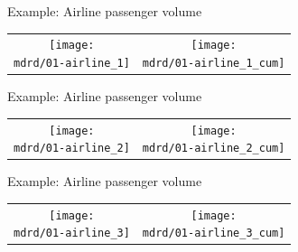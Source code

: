 \begin{frame}{Example: Airline passenger volume}
\newcommand{\wmgd}{0.5\columnwidth}
\newcommand{\hmgd}{3.0cm}
\newcommand{\mdrd}{../figures/01-airline}
\newcommand{\mbm}{\hspace{-0.3cm}}
{\footnotesize

}

\vspace{\baselineskip}

\begin{tabular}{cc}
\mbm \texttt{[image: \\mdrd/01-airline\_1]} & \texttt{[image: \\mdrd/01-airline\_1\_cum]}
\end{tabular}
\end{frame}

\begin{frame}{Example: Airline passenger volume}
\newcommand{\wmgd}{0.5\columnwidth}
\newcommand{\hmgd}{3.0cm}
\newcommand{\mdrd}{../figures/01-airline}
\newcommand{\mbm}{\hspace{-0.3cm}}
{\footnotesize

}

\vspace{\baselineskip}

\begin{tabular}{cc}
\mbm \texttt{[image: \\mdrd/01-airline\_2]} & \texttt{[image: \\mdrd/01-airline\_2\_cum]}
\end{tabular}
\end{frame}

\begin{frame}{Example: Airline passenger volume}
\newcommand{\wmgd}{0.5\columnwidth}
\newcommand{\hmgd}{3.0cm}
\newcommand{\mdrd}{../figures/01-airline}
\newcommand{\mbm}{\hspace{-0.3cm}}
{\footnotesize

}

\vspace{\baselineskip}

\begin{tabular}{cc}
\mbm \texttt{[image: \\mdrd/01-airline\_3]} & \texttt{[image: \\mdrd/01-airline\_3\_cum]}
\end{tabular}
\end{frame}

